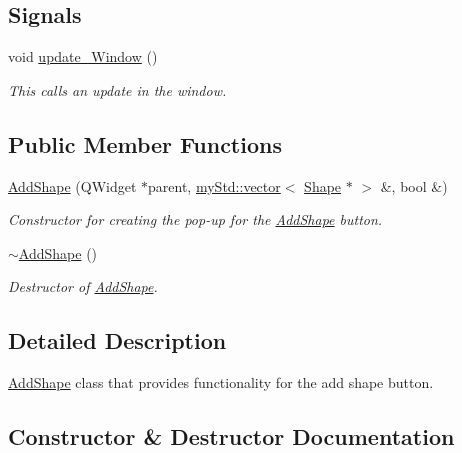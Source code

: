 \subsection*{Signals}
\begin{DoxyCompactItemize}
\item 
void \hyperlink{classAddShape_a6f79ea980ff8d6e7001c0b9b48d5ddb4}{update\+\_\+\+Window} ()
\begin{DoxyCompactList}\small\item\em This calls an update in the window. \end{DoxyCompactList}\end{DoxyCompactItemize}
\subsection*{Public Member Functions}
\begin{DoxyCompactItemize}
\item 
\hyperlink{classAddShape_a7d99059cc9f818e4225803aa2c624723}{Add\+Shape} (Q\+Widget $\ast$parent, \hyperlink{classmyStd_1_1vector}{my\+Std\+::vector}$<$ \hyperlink{classShape}{Shape} $\ast$ $>$ \&, bool \&)
\begin{DoxyCompactList}\small\item\em Constructor for creating the pop-\/up for the \hyperlink{classAddShape}{Add\+Shape} button. \end{DoxyCompactList}\item 
\hyperlink{classAddShape_aefd175938403da086e12162e19705939}{$\sim$\+Add\+Shape} ()
\begin{DoxyCompactList}\small\item\em Destructor of \hyperlink{classAddShape}{Add\+Shape}. \end{DoxyCompactList}\end{DoxyCompactItemize}


\subsection{Detailed Description}
\hyperlink{classAddShape}{Add\+Shape} class that provides functionality for the add shape button. 

\subsection{Constructor \& Destructor Documentation}
